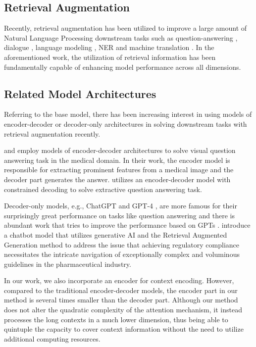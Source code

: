 \iffalse
\subsection{Retrieval Augmentation}
Recently, retrieval augmentation has been utilized to improve a large amount of Natural Language Processing downstream tasks such as question-answering \cite{chen-etal-2017-reading, lewis2020retrieval, kwiatkowski-etal-2019-natural, fan-etal-2019-eli5}, dialogue \cite{moghe-etal-2018-towards}, language modeling \cite{khandelwal2020generalization}, NER \cite{wang-etal-2022-damo, wang2021improving} and machine translation \cite{gu2018search, xu-etal-2022-boosting}. In the aforementioned work, the utilization of retrieval information has been fundamentally capable of enhancing model performance across all dimensions.

\subsection{Related Model Architectures}
Referring to the base model, there has been increasing interest in using models of encoder-decoder or decoder-only architectures in solving downstream tasks with retrieval augmentation recently. 

\citet{allaouzi2019encoder} and \citet{zhou2023medical} employ models of encoder-decoder architectures to solve visual question answering task in the medical domain. In their work, the encoder model is responsible for extracting prominent features from a medical image and the decoder part generates the answer. \citet{math11071624} utilizes an encoder-decoder model with constrained decoding to solve extractive question answering task. 

Decoder-only models, e.g., ChatGPT and GPT-4 \cite{achiam2023gpt}, are more famous for their surprisingly great performance on tasks like question answering \cite{ali2022performance} and there is abundant work that tries to improve the performance based on GPTs \cite{pereira2023visconde}. \citet{kim2024rag} introduce a chatbot model that utilizes generative AI and the Retrieval Augmented Generation method to address the issue that achieving regulatory compliance necessitates the intricate navigation of exceptionally complex and voluminous guidelines in the pharmaceutical industry.

In our work, we also incorporate an encoder for context encoding. However, compared to the traditional encoder-decoder models, the encoder part in our method is several times smaller than the decoder part. Although our method does not alter the quadratic complexity of the attention mechanism, it instead processes the long contexts in a much lower dimension, thus being able to quintuple the capacity to cover context information without the need to utilize additional computing resources.

